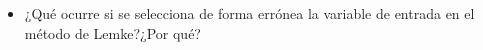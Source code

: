 \begin{itemize}

    \item ¿Qué ocurre si se selecciona de forma errónea la variable de entrada en el método de Lemke?¿Por qué?


\end{itemize}

